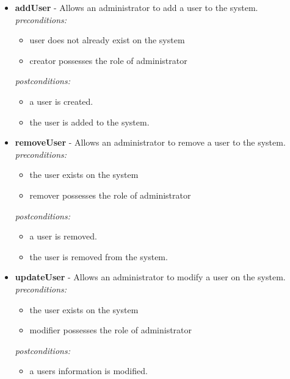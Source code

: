 \documentclass[a4paper,12pt]{article}
\begin{document}
	\begin{itemize}
		\item \textbf{addUser} - Allows an administrator to add a user to the system.\\[0.5cm]
		\textit{preconditions:}
		\begin{itemize}
			\item user does not already exist on the system
			\item creator possesses the role of administrator
		\end{itemize}
		
		\textit{postconditions:}
		\begin{itemize}
			\item a user is created.
			\item the user is added to the system.\\[0.5cm]
		\end{itemize}
		
		\item \textbf{removeUser} - Allows an administrator to remove a user to the system.\\[0.5cm]
		\textit{preconditions:}
		\begin{itemize}
			\item the user exists on the system
			\item remover possesses the role of administrator
		\end{itemize}
		
		\textit{postconditions:}
		\begin{itemize}
			\item a user is removed.
			\item the user is removed from the system.\\[0.5cm]
		\end{itemize}
		
		\item \textbf{updateUser} - Allows an administrator to modify a user on the system.\\[0.5cm]
		\textit{preconditions:}
		\begin{itemize}
			\item the user exists on the system
			\item modifier possesses the role of administrator
		\end{itemize}
		
		\textit{postconditions:}
		\begin{itemize}
			\item a users information is modified.\\[0.5cm]
		\end{itemize}
		

\end{itemize}
\end{document}
